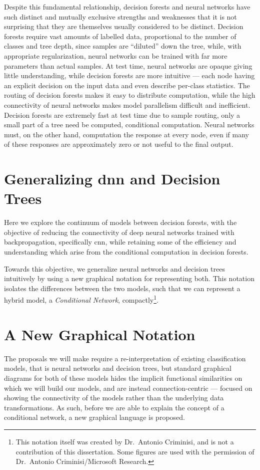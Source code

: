 \documentclass[thesis]{subfiles}
\begin{document}
	Despite this fundamental relationship, decision forests and neural networks have such distinct and mutually exclusive strengths and weaknesses that it is not surprising that they are themselves usually considered to be distinct. Decision forests require vast amounts of labelled data, proportional to the number of classes and tree depth, since samples are ``diluted'' down the tree, while, with appropriate regularization, neural networks can be trained with far more parameters than actual samples. At test time, neural networks are opaque giving little understanding, while decision forests are more intuitive --- each node having an explicit decision on the input data and even describe per-class statistics. The routing of decision forests makes it easy to distribute computation, while the high connectivity of neural networks makes model parallelism difficult and inefficient. Decision forests are extremely fast at test time due to sample routing, only a small part of a tree need be computed, \ie conditional computation. Neural networks must, on the other hand, computation the response at every node, even if many of these responses are approximately zero or not useful to the final output.
	
	\section{Generalizing \gls{dnn} and Decision Trees}
	Here we explore the continuum of models between decision forests, with the objective of reducing the connectivity of deep neural networks trained with backpropagation, specifically \gls{cnn}, while retaining some of the efficiency and understanding which arise from the conditional computation in decision forests.
	
	Towards this objective, we generalize neural networks and decision trees intuitively by using a new graphical notation for representing both. This notation isolates the differences between the two models, such that we can represent a hybrid model, \ie a \emph{Conditional Network}, compactly\footnote{This notation itself was created by Dr.\ Antonio Criminisi, and is not a contribution of this dissertation. Some figures are used with the permission of Dr.\ Antonio Criminisi/Microsoft Research.}.
	
	\section{A New Graphical Notation}
	The proposals we will make require a re-interpretation of existing classification models, that is neural networks and decision trees, but standard graphical diagrams for both of these models hides the implicit functional similarities on which we will build our models, and are instead connection-centric --- focused on showing the connectivity of the models rather than the underlying data transformations. As such, before we are able to explain the concept of a conditional network, a new graphical language is proposed.
	
\end{document}
